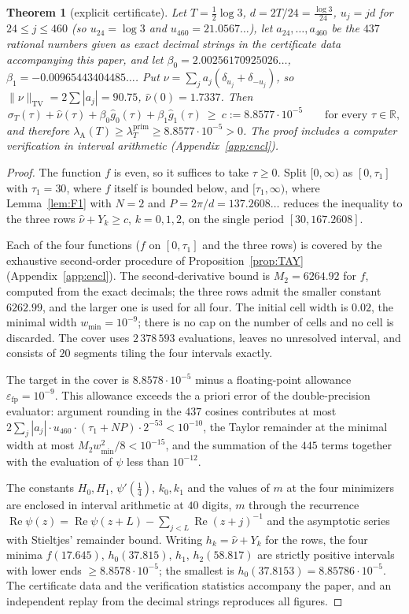 \documentclass[11pt]{amsart}
\newtheorem{theorem}{Theorem}[section]
\theoremstyle{definition}
\theoremstyle{remark}
\newcommand{\R}{\mathbb R}
\newcommand{\Rel}{\operatorname{Re}}
\newcommand{\TV}{\operatorname{TV}}
\newcommand{\lamP}{\lambda^{\mathrm{prim}}_T}
\newcommand{\lamA}{\lambda_{\mathrm A}(T)}
\newcommand{\sT}{\sigma_T}
\newcommand{\gh}[1]{\widehat g_{#1}}
\newcommand{\nuh}{\widehat\nu}
\begin{document}
\begin{theorem}[explicit certificate]\label{thm:C}
Let $T=\frac12\log3$, $d=2T/24=\frac{\log3}{24}$,
$u_j=jd$ for $24\le j\le460$ (so $u_{24}=\log3$ and $u_{460}=21.0567\ldots$), let
$a_{24},\dots,a_{460}$ be the $437$ rational numbers given as exact decimal strings in the
certificate data accompanying this paper, and let
$\beta_0=2.00256170925026\ldots$, $\beta_1=-0.00965443404485\ldots$. Put
$\nu=\sum_ja_j(\delta_{u_j}+\delta_{-u_j})$, so $\|\nu\|_{\TV}=2\sum|a_j|=90.75$, $\nuh(0)=1.7337$.
Then
\[
\sT(\tau)+\nuh(\tau)+\beta_0\gh0(\tau)+\beta_1\gh1(\tau)\ \ge\ c:=8.8577\cdot10^{-5}\qquad\text{for every }\tau\in\R,
\]
and therefore $\lamA\ge\lamP\ge8.8577\cdot10^{-5}>0$. The proof includes a computer verification
in interval arithmetic (Appendix~\ref{app:encl}).
\end{theorem}

\begin{proof}
The function $f$ is even, so it suffices to take $\tau\ge0$. Split $[0,\infty)$ as $[0,\tau_1]$
with $\tau_1=30$, where $f$ itself is bounded below, and $[\tau_1,\infty)$, where
Lemma~\ref{lem:F1} with $N=2$ and $P=2\pi/d=137.2608\ldots$ reduces the inequality to the three
rows $\nuh+Y_k\ge c$, $k=0,1,2$, on the single period $[30,167.2608]$.

Each of the four functions ($f$ on $[0,\tau_1]$ and the three rows) is covered by the exhaustive
second-order procedure of Proposition~\ref{prop:TAY} (Appendix~\ref{app:encl}). The second-derivative
bound is $M_2=6264.92$ for $f$, computed from the exact decimals; the three rows admit the smaller
constant $6262.99$, and the larger one is used for all four. The initial cell width is $0.02$, the
minimal width $w_{\min}=10^{-9}$; there is no cap on the number of cells and no cell is discarded.
The cover uses $2\,378\,593$ evaluations, leaves no unresolved interval, and consists of $20$
segments tiling the four intervals exactly.

The target in the cover is $8.8578\cdot10^{-5}$ minus a floating-point allowance
$\varepsilon_{\mathrm{fp}}=10^{-9}$. This allowance exceeds the a priori error of the double-precision
evaluator: argument rounding in the $437$ cosines contributes at most
$2\sum_j|a_j|\cdot u_{460}\cdot(\tau_1+NP)\cdot2^{-53}<10^{-10}$, the Taylor remainder at the minimal
width at most $M_2w_{\min}^2/8<10^{-15}$, and the summation of the $445$ terms together with the
evaluation of $\psi$ less than $10^{-12}$.

The constants $H_0,H_1$, $\psi'(\frac14)$, $k_0,k_1$ and the values of $m$ at the four minimizers
are enclosed in interval arithmetic at $40$ digits, $m$ through the recurrence
$\Rel\psi(z)=\Rel\psi(z+L)-\sum_{j<L}\Rel(z+j)^{-1}$ and the asymptotic series with Stieltjes'
remainder bound. Writing $h_k=\nuh+Y_k$ for the rows, the four minima $f(17.645)$, $h_0(37.815)$, $h_1$, $h_2(58.817)$
are strictly positive intervals with lower ends $\ge8.8578\cdot10^{-5}$; the smallest is
$h_0(37.8153)=8.85786\cdot10^{-5}$. The certificate data and the verification statistics accompany
the paper, and an independent replay from the decimal strings reproduces all
figures.
\end{proof}
\end{document}
